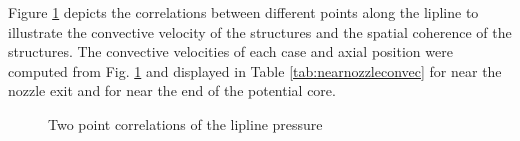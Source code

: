 \documentclass[english]{aiaa-tc}
\begin{document}
Figure \ref{liplineconvec} depicts the correlations between different points along the lipline to illustrate the convective velocity of the structures and the spatial coherence of the structures.
The convective velocities of each case and axial position were computed from Fig. \ref{liplineconvec} and displayed in Table \ref{tab:nearnozzleconvec} for near the nozzle exit and for near the end of the potential core.
\begin{figure}
\begin{centering}

\end{centering}
\caption{Two point correlations of the lipline pressure}\label{liplineconvec}
\end{figure}
\end{document}
